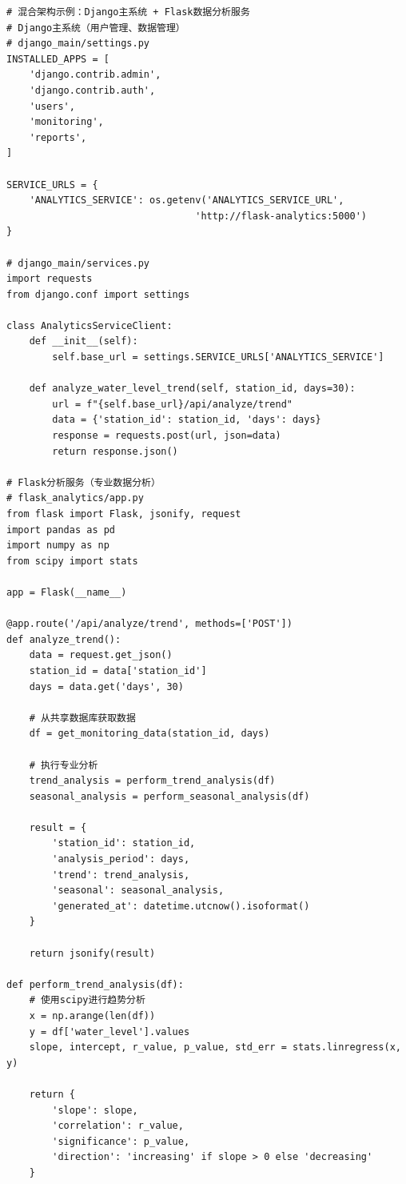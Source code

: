 \begin{lstlisting}[style=python]
# 混合架构示例：Django主系统 + Flask数据分析服务
# Django主系统（用户管理、数据管理）
# django_main/settings.py
INSTALLED_APPS = [
    'django.contrib.admin',
    'django.contrib.auth',
    'users',
    'monitoring',
    'reports',
]

SERVICE_URLS = {
    'ANALYTICS_SERVICE': os.getenv('ANALYTICS_SERVICE_URL', 
                                 'http://flask-analytics:5000')
}

# django_main/services.py
import requests
from django.conf import settings

class AnalyticsServiceClient:
    def __init__(self):
        self.base_url = settings.SERVICE_URLS['ANALYTICS_SERVICE']
    
    def analyze_water_level_trend(self, station_id, days=30):
        url = f"{self.base_url}/api/analyze/trend"
        data = {'station_id': station_id, 'days': days}
        response = requests.post(url, json=data)
        return response.json()

# Flask分析服务（专业数据分析）
# flask_analytics/app.py
from flask import Flask, jsonify, request
import pandas as pd
import numpy as np
from scipy import stats

app = Flask(__name__)

@app.route('/api/analyze/trend', methods=['POST'])
def analyze_trend():
    data = request.get_json()
    station_id = data['station_id']
    days = data.get('days', 30)
    
    # 从共享数据库获取数据
    df = get_monitoring_data(station_id, days)
    
    # 执行专业分析
    trend_analysis = perform_trend_analysis(df)
    seasonal_analysis = perform_seasonal_analysis(df)
    
    result = {
        'station_id': station_id,
        'analysis_period': days,
        'trend': trend_analysis,
        'seasonal': seasonal_analysis,
        'generated_at': datetime.utcnow().isoformat()
    }
    
    return jsonify(result)

def perform_trend_analysis(df):
    # 使用scipy进行趋势分析
    x = np.arange(len(df))
    y = df['water_level'].values
    slope, intercept, r_value, p_value, std_err = stats.linregress(x, y)
    
    return {
        'slope': slope,
        'correlation': r_value,
        'significance': p_value,
        'direction': 'increasing' if slope > 0 else 'decreasing'
    }
\end{lstlisting}


